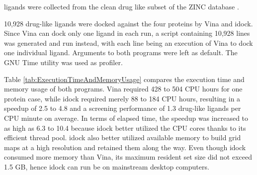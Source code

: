 \documentclass[10pt,conference,compsocconf]{../IEEEtran}
\begin{document}
ligands were collected from the clean drug like subset of the ZINC database \cite{532}.

10,928 drug-like ligands were docked against the four proteins by Vina and idock. Since Vina can dock only one ligand in each run, a script containing 10,928 lines was generated and run instead, with each line being an execution of Vina to dock one individual ligand. Arguments to both programs were left as default. The GNU Time utility was used as profiler.

Table \ref{tab:ExecutionTimeAndMemoryUsage} compares the execution time and memory usage of both programs. Vina required 428 to 504 CPU hours for one protein case, while idock required merely 88 to 184 CPU hours, resulting in a speedup of 2.5 to 4.8 and a screening performance of 1.3 drug-like ligands per CPU minute on average. In terms of elapsed time, the speedup was increased to as high as 6.3 to 10.4 because idock better utilized the CPU cores thanks to its efficient thread pool. idock also better utilized available memory to build grid maps at a high resolution and retained them along the way. Even though idock consumed more memory than Vina, its maximum resident set size did not exceed 1.5 GB, hence idock can run be on mainstream desktop computers.
\end{document}
